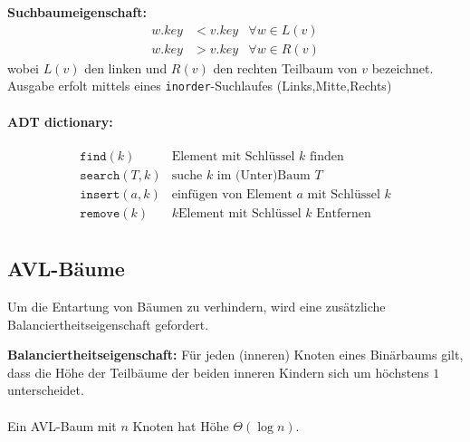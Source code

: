 \documentclass{scrartcl}
\begin{document}
\begin{shaded}
\textbf{Suchbaumeigenschaft:}
\begin{align*}
	w.key &< v.key & \forall w \in L(v) \\
	w.key &> v.key & \forall w \in R(v)
\end{align*}
wobei $L(v)$ den linken und $R(v)$ den rechten Teilbaum von $v$ bezeichnet. \\
Ausgabe erfolt mittels eines \texttt{inorder}-Suchlaufes (Links,Mitte,Rechts)
\paragraph{ADT dictionary:}
\begin{align*}
\texttt{find}(k) & \textrm{Element mit Schlüssel } k \textrm{ finden} \\
\texttt{search}(T,k) & \textrm{suche } k \textrm{ im (Unter)Baum } T \\
\texttt{insert}(a,k) & \textrm{einfügen von Element } a \textrm{ mit Schlüssel } k \\
\texttt{remove}(k) & k \textrm{Element mit Schlüssel } k \textrm{ Entfernen} \\
\end{align*}
\end{shaded}

\subsection{AVL-Bäume}
Um die Entartung von Bäumen zu verhindern, wird eine zusätzliche Balanciertheitseigenschaft gefordert.

\begin{shaded}
\textbf{Balanciertheitseigenschaft:} Für jeden (inneren) Knoten eines Binärbaums gilt, dass die Höhe der Teilbäume der beiden inneren Kindern sich um höchstens $1$ unterscheidet.\\ \ \\
Ein AVL-Baum mit $n$ Knoten hat Höhe $\Theta(\log n)$.
\end{shaded}
\end{document}
